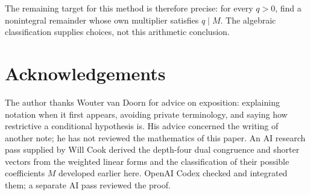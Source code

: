 \documentclass[11pt]{article}
\begin{document}
The remaining target for this method is therefore precise: for every
$q>0$, find a nonintegral remainder whose own multiplier satisfies
$q\mid M$. The algebraic classification supplies choices, not this
arithmetic conclusion.

\section*{Acknowledgements}
The author thanks Wouter van Doorn for advice on exposition: explaining notation when it first appears, avoiding private terminology, and saying how restrictive a conditional hypothesis is. His advice concerned the writing of another note; he has not reviewed the mathematics of this paper.
An AI research pass supplied by Will Cook derived the depth-four dual
congruence and shorter vectors from the weighted linear forms and the
classification of their possible coefficients $M$ developed earlier here. OpenAI Codex
checked and integrated them; a separate AI pass reviewed the proof.
\end{document}
